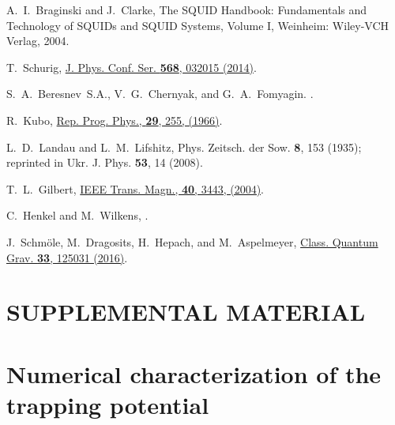 \documentclass[twocolumn,superscriptaddress,floatfix,preprintnumbers,prl]{revtex4}
\begin{document}
\begin{thebibliography}{27}
A.~I.~Braginski and J.~Clarke, The SQUID Handbook: Fundamentals and Technology of SQUIDs and SQUID Systems, Volume I, Weinheim: Wiley-VCH Verlag, 2004.


T.~Schurig,
\href{http://iopscience.iop.org/article/10.1088/1742-6596/568/3/032015}{J. Phys. Conf. Ser. {\bf 568}, 032015 (2014)}.


S.~A.~Beresnev~S.A., V.~G.~Chernyak, and G.~A.~Fomyagin. \href{http://dx.doi.org/10.1017/S0022112090003007}{}.

R.~Kubo, \href{http://dx.doi.org/10.1088/0034-4885/29/1/306}{Rep. Prog. Phys., {\bf 29}, 255, (1966)}.

L.~D.~Landau and L.~M.~Lifshitz, Phys. Zeitsch. der Sow. {\bf 8}, 153 (1935); reprinted in Ukr. J. Phys. {\bf 53}, 14 (2008).

T.~L.~Gilbert, 
\href{http://ieeexplore.ieee.org/document/1353448/}{IEEE Trans. Magn., {\bf 40}, 3443, (2004)}.



C.~Henkel and M.~Wilkens, 
\href{http://epljournal.edpsciences.org/articles/epl/abs/1999/16/47402/47402.html}{}.


J.~Schm\"{o}le, M.~Dragosits, H.~Hepach, and M.~Aspelmeyer, 
\href{http://iopscience.iop.org/article/10.1088/0264-9381/33/12/125031/meta}{Class. Quantum Grav. {\bf 33}, 125031 (2016)}.



\end{thebibliography}

\newpage

\newpage

\newpage



\section*{SUPPLEMENTAL MATERIAL} 

\section{Numerical characterization of the trapping potential}
\end{document}
